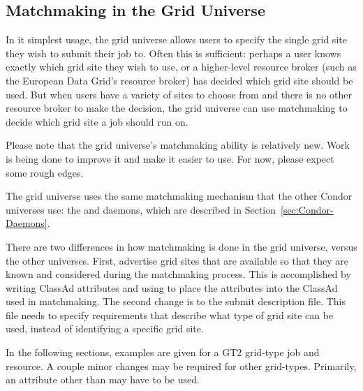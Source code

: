 \subsection{\label{sec:Condor-G-Matchmaking}Matchmaking in the Grid Universe}

In it simplest usage, the grid universe allows users to specify the single
grid site they wish to submit their job to.
Often this is sufficient: perhaps a user knows exactly which
grid site they wish to use,
or a higher-level resource broker
(such as the European Data Grid's resource broker)
has decided which grid site should be used.
But when users have a variety of sites to choose from and there
is no other resource broker to make the decision, the grid universe can use
matchmaking to decide which grid site a job should run on. 

Please note that the grid universe's matchmaking ability is relatively
new. Work is being done to improve it and make it easier to use. For
now, please expect some rough edges. 

The grid universe uses the same matchmaking mechanism that the other
Condor universes use: the
 and  daemons, which are described in
Section~\ref{sec:Condor-Daemons}. 

There are two differences in how matchmaking is done in the grid
universe, versus the other universes.
First,
advertise grid sites that are available so that they are
known and considered during the matchmaking process.
This is accomplished by writing ClassAd attributes and
using  to place the attributes into the
ClassAd used in matchmaking.
The second change is to the
submit description file.
This file needs to specify requirements that describe what
type of grid site can be used, instead of identifying a specific grid site.


In the following sections, examples are given for a GT2 grid-type job and
resource. A couple minor changes may be required for other grid-types.
Primarily, an attribute other than  may have to be
used.

